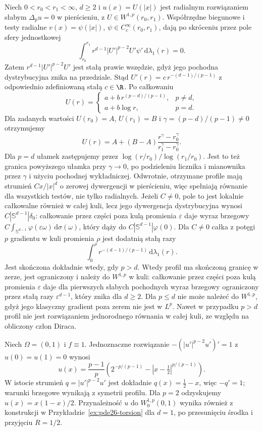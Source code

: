 \begin{przyklad}\label{ex:pde26-annulus}
Niech $0<r_0<r_1<\infty$, $d\ge2$ i $u(x)=U(|x|)$
jest radialnym rozwiązaniem słabym $\Delta_pu=0$
w pierścieniu, z $U\in W^{1,p}(r_0,r_1)$.
Współrzędne biegunowe i testy radialne
$v(x)=\psi(|x|)$, $\psi\in C_c^\infty(r_0,r_1)$,
dają po skróceniu przez pole sfery jednostkowej
\[
 \int_{r_0}^{r_1}r^{d-1}|U'|^{p-2}U'\psi'
                 \,\mathrm d\lambda_1(r)=0.
\]
Zatem $r^{d-1}|U'|^{p-2}U'$ jest stałą prawie
wszędzie, gdyż jego pochodna dystrybucyjna znika
na przedziale.
Stąd $U'(r)=c\,r^{-(d-1)/(p-1)}$ z odpowiednio
zdefiniowaną stałą $c\in\R$. Po całkowaniu
\[
 U(r)=\begin{cases}
 a+b\,r^{(p-d)/(p-1)},&p\ne d,\\
 a+b\log r,&p=d.
 \end{cases}
\]
Dla zadanych wartości $U(r_0)=A$, $U(r_1)=B$
i $\gamma=(p-d)/(p-1)\ne0$ otrzymujemy
\[
 U(r)=A+(B-A)\frac{r^\gamma-r_0^\gamma}
                         {r_1^\gamma-r_0^\gamma}.
\]
Dla $p=d$ ułamek zastępujemy przez
$\log(r/r_0)/\log(r_1/r_0)$.
Jest to też granica powyższego ułamka przy
$\gamma\to0$, po podzieleniu licznika i mianownika
przez $\gamma$ i użyciu pochodnej wykładniczej.
Odwrotnie, otrzymane profile mają strumień
$C x/|x|^d$ o zerowej dywergencji w pierścieniu,
więc spełniają równanie dla wszystkich testów,
nie tylko radialnych. Jeżeli $C\ne0$, pole to
jest lokalnie całkowalne również w całej kuli,
lecz jego dywergencja dystrybucyjna wynosi
$C|\mathbb S^{d-1}|\delta_0$: całkowanie przez
części poza kulą promienia $\varepsilon$ daje
wyraz brzegowy $C\int_{\mathbb S^{d-1}}
\varphi(\varepsilon\omega)\,\mathrm d\sigma(\omega)$,
który dąży do $C|\mathbb S^{d-1}|\varphi(0)$.
Dla $C\ne0$ całka z potęgi $p$ gradientu w kuli
promienia $\rho$ jest dodatnią stałą razy
\[
 \int_0^\rho r^{-(d-1)/(p-1)}\,\mathrm d\lambda_1(r).
\]
Jest skończona dokładnie wtedy, gdy $p>d$.
Wtedy profil ma skończoną granicę w zerze, jest
ograniczony i należy do $W^{1,p}$ w kuli:
całkowanie przez części poza kulą promienia
$\varepsilon$ daje dla pierwszych słabych pochodnych
wyraz brzegowy ograniczony przez stałą razy
$\varepsilon^{d-1}$, który znika dla $d\ge2$.
Dla $p\le d$ nie może należeć do $W^{1,p}$,
gdyż jego klasyczny gradient poza zerem nie
jest w $L^p$. Nawet w przypadku $p>d$ profil
nie jest rozwiązaniem jednorodnego równania
w całej kuli, ze względu na obliczony człon Diraca.
\end{przyklad}

\begin{przyklad}\label{ex:pde26-1d}
Niech $\Omega=(0,1)$ i $f\equiv1$. Jednoznaczne rozwiązanie
$-(|u'|^{p-2}u')'=1$ z $u(0)=u(1)=0$ wynosi
\[
 u(x)=\frac{p-1}{p}\left(2^{-p/(p-1)}
 -|x-\tfrac12|^{p/(p-1)}\right).
\]
W istocie strumień $q=|u'|^{p-2}u'$ jest dokładnie
$q(x)=\tfrac12-x$, więc $-q'=1$; warunki brzegowe
wynikają z symetrii profilu. Dla $p=2$ odzyskujemy
$u(x)=x(1-x)/2$. Przynależność $u$ do
$W_0^{1,p}(0,1)$ wynika również z konstrukcji
w Przykładzie~\ref{ex:pde26-torsion} dla $d=1$,
po przesunięciu środka i przyjęciu $R=1/2$.
\end{przyklad}

